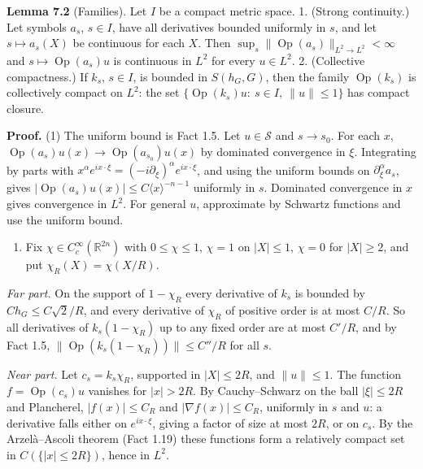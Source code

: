 \documentclass[
  11pt,
]{article}
\providecommand{\tightlist}{%
  \setlength{\itemsep}{0pt}\setlength{\parskip}{0pt}}
\begin{document}
\textbf{Lemma 7.2} (Families). Let \(I\) be a compact metric space. 1.
(Strong continuity.) Let symbols \(a_s\), \(s\in I\), have all
derivatives bounded uniformly in \(s\), and let \(s\mapsto a_s(X)\) be
continuous for each \(X\). Then
\(\sup_s\|\operatorname{Op}(a_s)\|_{L^2\to L^2}<\infty\) and
\(s\mapsto\operatorname{Op}(a_s)u\) is continuous in \(L^2\) for every
\(u\in L^2\). 2. (Collective compactness.) If \(k_s\), \(s\in I\), is
bounded in \(S(h_G,G)\), then the family \(\operatorname{Op}(k_s)\) is
collectively compact on \(L^2\): the set
\(\{\operatorname{Op}(k_s)u:\ s\in I,\ \|u\|\le1\}\) has compact
closure.

\textbf{Proof.} (1) The uniform bound is Fact 1.5. Let
\(u\in\mathcal S\) and \(s\to s_0\). For each \(x\),
\(\operatorname{Op}(a_s)u(x)\to\operatorname{Op}(a_{s_0})u(x)\) by
dominated convergence in \(\xi\). Integrating by parts with
\(x^\alpha e^{ix\cdot\xi}=(-i\partial_\xi)^\alpha e^{ix\cdot\xi}\), and
using the uniform bounds on \(\partial_\xi^\alpha a_s\), gives
\(|\operatorname{Op}(a_s)u(x)|\le C\langle x\rangle^{-n-1}\) uniformly
in \(s\). Dominated convergence in \(x\) gives convergence in \(L^2\).
For general \(u\), approximate by Schwartz functions and use the uniform
bound.

\begin{enumerate}
\def\labelenumi{(\arabic{enumi})}
\setcounter{enumi}{1}
\tightlist
\item
  Fix \(\chi\in C_c^\infty(\mathbb R^{2n})\) with \(0\le\chi\le1\),
  \(\chi=1\) on \(|X|\le1\), \(\chi=0\) for \(|X|\ge2\), and put
  \(\chi_R(X)=\chi(X/R)\).
\end{enumerate}

\emph{Far part.} On the support of \(1-\chi_R\) every derivative of
\(k_s\) is bounded by \(Ch_G\le C\sqrt2/R\), and every derivative of
\(\chi_R\) of positive order is at most \(C/R\). So all derivatives of
\(k_s(1-\chi_R)\) up to any fixed order are at most \(C'/R\), and by
Fact 1.5, \(\|\operatorname{Op}(k_s(1-\chi_R))\|\le C''/R\) for all
\(s\).

\emph{Near part.} Let \(c_s=k_s\chi_R\), supported in \(|X|\le2R\), and
\(\|u\|\le1\). The function \(f=\operatorname{Op}(c_s)u\) vanishes for
\(|x|>2R\). By Cauchy--Schwarz on the ball \(|\xi|\le2R\) and
Plancherel, \(|f(x)|\le C_R\) and \(|\nabla f(x)|\le C_R\), uniformly in
\(s\) and \(u\): a derivative falls either on \(e^{ix\cdot\xi}\), giving
a factor of size at most \(2R\), or on \(c_s\). By the Arzelà--Ascoli
theorem (Fact 1.19) these functions form a relatively compact set in
\(C(\{|x|\le2R\})\), hence in \(L^2\).
\end{document}
